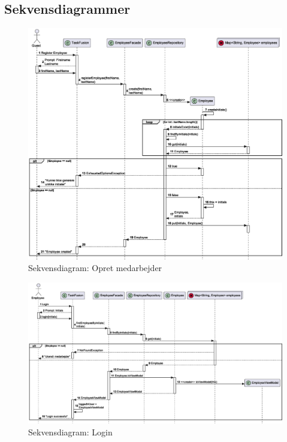 \subsection{Sekvensdiagrammer}\label{sec:sequence}
\begin{figure}[H]
    \centering
    \caption{Sekvensdiagram: Opret medarbejder}\label{fig:sequenceRegisterEmployee}
    \includegraphics[width=\textwidth]{RequirementsAndDesign/SequenceDiagrams/seqRegisterEmployee.eps}
\end{figure}
\begin{figure}[H]
    \centering
    \caption{Sekvensdiagram: Login}\label{fig:sequenceLogin}
    \includegraphics[width=\textwidth]{RequirementsAndDesign/SequenceDiagrams/seqLogin.eps}
\end{figure}
